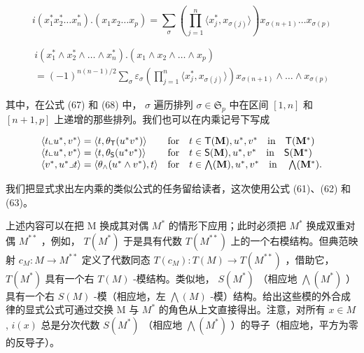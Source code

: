 \[
i \left(x _ {1} ^ {*} x _ {2} ^ {*} \dots x _ {n} ^ {*}\right). (x _ {1} x _ {2} \dots x _ {p}) = \sum_ {\sigma} \left(\prod_ {j = 1} ^ {n} \langle x _ {j} ^ {*}, x _ {\sigma (j)} \rangle\right) x _ {\sigma (n + 1)} \dots x _ {\sigma (p)}\tag{67}
\]

\[
\begin{array}{l} i \left(x _ {1} ^ {*} \wedge x _ {2} ^ {*} \wedge \dots \wedge x _ {n} ^ {*}\right). \left(x _ {1} \wedge x _ {2} \wedge \dots \wedge x _ {p}\right) \\ = (- 1) ^ {n (n - 1) / 2} \sum_ {\sigma} \varepsilon_ {\sigma} \left(\prod_ {j = 1} ^ {n} \langle x _ {j} ^ {*}, x _ {\sigma (j)} \rangle\right) x _ {\sigma (n + 1)} \wedge \dots \wedge x _ {\sigma (p)} \end{array}\tag{68}
\]

其中，在公式 (67) 和 (68) 中， \(\sigma\) 遍历排列 \(\sigma \in \mathfrak{S}_p\) 中在区间 \([1, n]\) 和 \([n + 1, p]\) 上递增的那些排列。我们也可以在内乘记号下写成

\[
\begin{array}{l l} \langle t \llcorner u ^ {*}, v ^ {*} \rangle = \langle t, \theta_ {\mathsf {T}} (u ^ {*} v ^ {*}) \rangle & \text {for} \quad t \in \mathsf {T} (\mathbf {M}), u ^ {*}, v ^ {*} \quad \text {in} \quad \mathsf {T} (\mathbf {M} ^ {*}) \\ \langle t \llcorner u ^ {*}, v ^ {*} \rangle = \langle t, \theta_ {\mathsf {S}} (u ^ {*} v ^ {*}) \rangle & \text {for} \quad t \in \mathsf {S} (\mathbf {M}), u ^ {*}, v ^ {*} \quad \text {in} \quad \mathsf {S} (\mathbf {M} ^ {*}) \\ \langle v ^ {*}, u ^ {*} \lrcorner t \rangle = \langle \theta_ {\wedge} (u ^ {*} \wedge v ^ {*}), t \rangle & \text {for} \quad t \in \bigwedge (\mathbf {M}), u ^ {*}, v ^ {*} \quad \text {in} \quad \bigwedge (\mathbf {M} ^ {*}). \end{array}
\]

我们把显式求出左内乘的类似公式的任务留给读者，这次使用公式 (61)、(62) 和 (63)。

上述内容可以在把 M 换成其对偶 \(M^{*}\) 的情形下应用；此时必须把 \(M^{*}\) 换成双重对偶 \(M^{**}\) ，例如， \(T(M^{*})\) 于是具有代数 \(T(M^{**})\) 上的一个右模结构。但典范映射 \(c_{M}: M \to M^{**}\) 定义了代数同态 \(T(c_{M}): T(M) \to T(M^{**})\) ，借助它， \(T(M^{*})\) 具有一个右 \(T(M)\) -模结构。类似地， \(S(M^{*})\) （相应地 \(\bigwedge(M^{*})\) ）具有一个右 \(S(M)\) -模（相应地，左 \(\bigwedge(M)\) -模）结构。给出这些模的外合成律的显式公式可通过交换 M 与 \(M^{*}\) 的角色从上文直接得出。注意，对所有 \(x \in M\) , \(i(x)\) 总是分次代数 \(S(M^{*})\) （相应地 \(\bigwedge(M^{*})\) ）的导子（相应地，平方为零的反导子）。

